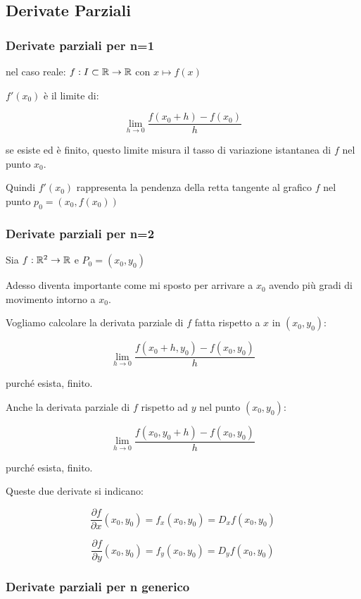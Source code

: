 \subsection{Derivate Parziali}

\subsubsection{Derivate parziali per n=1}

nel caso reale: \(f: I \subset \mathbb{R} \to \mathbb{R} \) con \(x \mapsto f(x)\)

\(f'(x_0)\) è il limite di:

\[
    \lim_{ h \to 0 } \frac{f(x_0+h)-f(x_0)}{h}
\]

se esiste ed è finito, questo limite misura il tasso di variazione istantanea di \(f\) nel punto \(x_0\).

Quindi \(f'(x_0)\) rappresenta la pendenza della retta tangente al grafico \(f\) nel punto \(p_0=(x_0,f(x_0))\)

\subsubsection{Derivate parziali per n=2}

Sia \(f: \mathbb{R}^2 \to \mathbb{R} \) e \(P_0=(x_0,y_0)\)

Adesso diventa importante come mi sposto per arrivare a \(x_0\) avendo più gradi di movimento intorno a \(x_0\).

Vogliamo calcolare la derivata parziale di \(f\) fatta rispetto a \(x\) in \((x_0,y_0)\):

\[
    \lim_{ h \to 0 } \frac{f(x_0+h,y_0) -f(x_0,y_0)}{h}
\]

purché esista, finito.

Anche la derivata parziale di \(f\) rispetto ad \(y\) nel punto \((x_0,y_0)\):

\[
    \lim_{ h \to 0 } \frac{f(x_0,y_0+h) - f(x_0,y_0)}{h}
\]

purché esista, finito.

Queste due derivate si indicano:

\[
    \frac{\partial f}{\partial x}(x_0,y_0) = f_x(x_0,y_0) = D_{x}f(x_0,y_0)
\]

\[
    \frac{\partial f}{\partial y}(x_0,y_0) = f_y(x_0,y_0)= D_{y}f(x_0,y_0)
\]

\filbreak{}
\subsubsection{Derivate parziali per n generico}

